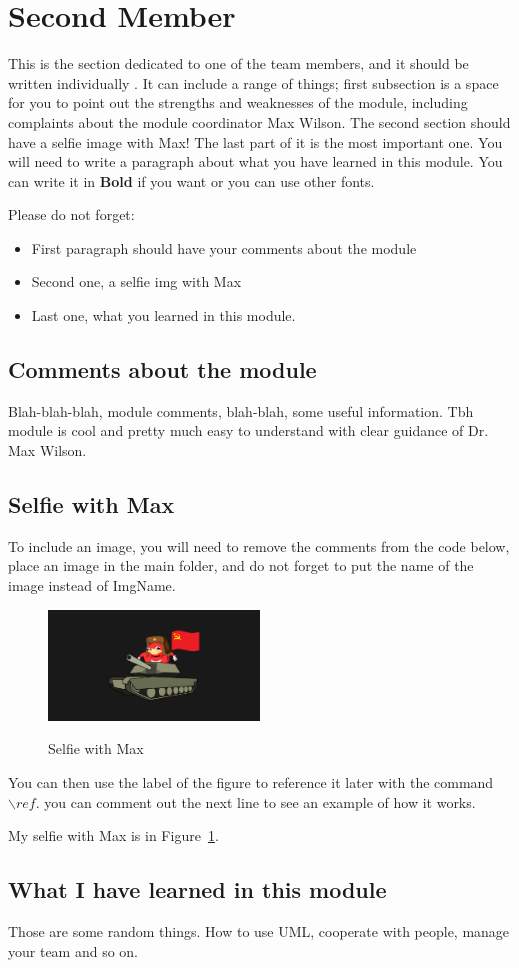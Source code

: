 \section{Second Member}
This is the section dedicated to one of the team members, and it should be written individually . It can include a range of things; first subsection is a space for you to point out the strengths and weaknesses of the module, including complaints about the module coordinator Max Wilson. The second section should have a selfie image with Max! The last part of it is the most important one. You will need to write a paragraph about what you have learned in this module. You can write it in \textbf{Bold} if you want or you can use other fonts. 

Please do not forget:
\begin{itemize}
	\item First paragraph should have your comments about the module
	\item Second one, a selfie img with Max
	\item Last one, what you learned in this module.
\end{itemize}

\subsection{Comments about the module}
Blah-blah-blah, module comments, blah-blah, some useful information. Tbh module is cool and pretty much easy to understand with clear guidance of Dr. Max Wilson. 

\subsection{Selfie with Max}

To include an image, you will need to remove the comments from the code below, place an image in the main folder, and do not forget to put the name of the image instead of ImgName. 

\begin{figure}[h]
\caption{Selfie with Max}
\centering
\includegraphics[width=0.5\textwidth]{sections/NewImg}
\label{fig:selfie}
\end{figure}

You can then use the label of the figure to reference it later with the command ${\backslash}ref.$ you can comment out the next line to see an example of how it works.

 My selfie with Max is in  Figure~\ref{fig:selfie}.

\subsection{What I have learned in this module}
Those are some random things. How to use UML, cooperate with people, manage your team and so on. 

